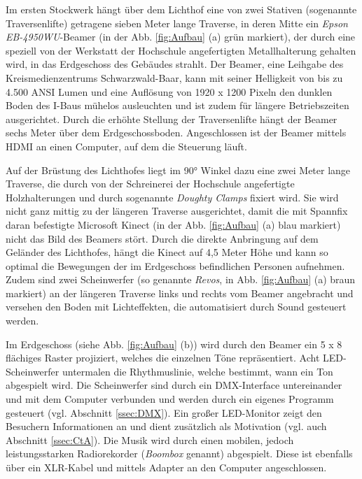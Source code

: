 Im ersten Stockwerk hängt über dem Lichthof eine von zwei Stativen (sogenannte Traversenlifte) getragene sieben Meter lange Traverse, in deren Mitte ein \emph{Epson EB-4950WU}-Beamer (in der Abb. \ref{fig:Aufbau} (a) grün markiert), der durch eine speziell von der Werkstatt der Hochschule angefertigten Metallhalterung gehalten wird, in das Erdgeschoss des Gebäudes strahlt. Der Beamer, eine Leihgabe des Kreismedienzentrums Schwarzwald-Baar, kann mit seiner Helligkeit von bis zu 4.500 ANSI Lumen und eine Auflösung von 1920 x 1200 Pixeln den dunklen Boden des I-Baus mühelos ausleuchten und ist zudem für längere Betriebszeiten ausgerichtet. Durch die erhöhte Stellung der Traversenlifte hängt der Beamer sechs Meter über dem Erdgeschossboden. Angeschlossen ist der Beamer mittels HDMI an einen Computer, auf dem die Steuerung läuft.

Auf der Brüstung des Lichthofes liegt im 90° Winkel dazu eine zwei Meter lange Traverse, die durch von der Schreinerei der Hochschule angefertigte Holzhalterungen und durch sogenannte \emph{Doughty Clamps} fixiert wird. Sie wird nicht ganz mittig zu der längeren Traverse ausgerichtet, damit die mit Spannfix daran befestigte Microsoft Kinect (in der Abb. \ref{fig:Aufbau} (a) blau markiert) nicht das Bild des Beamers stört. Durch die direkte Anbringung auf dem Geländer des Lichthofes, hängt die Kinect auf 4,5 Meter Höhe und kann so optimal die Bewegungen der im Erdgeschoss befindlichen Personen aufnehmen. Zudem sind zwei Scheinwerfer (so genannte \textit{Revos}, in Abb. \ref{fig:Aufbau} (a) braun markiert) an der längeren Traverse links und rechts vom Beamer angebracht und versehen den Boden mit Lichteffekten, die automatisiert durch Sound gesteuert werden.

Im Erdgeschoss (siehe Abb. \ref{fig:Aufbau} (b)) wird durch den Beamer ein 5 x 8 flächiges Raster projiziert, welches die einzelnen Töne repräsentiert. Acht LED-Scheinwerfer untermalen die Rhythmuslinie, welche bestimmt, wann ein Ton abgespielt wird. Die Scheinwerfer sind durch ein DMX-Interface untereinander und mit dem Computer verbunden und werden durch ein eigenes Programm gesteuert (vgl. Abschnitt \ref{ssec:DMX}). Ein großer LED-Monitor zeigt den Besuchern Informationen an und dient zusätzlich als Motivation (vgl. auch Abschnitt \ref{ssec:CtA}). Die Musik wird durch einen mobilen, jedoch leistungsstarken Radiorekorder (\textit{Boombox} genannt) abgespielt. Diese ist ebenfalls über ein XLR-Kabel und mittels Adapter an den Computer angeschlossen.
